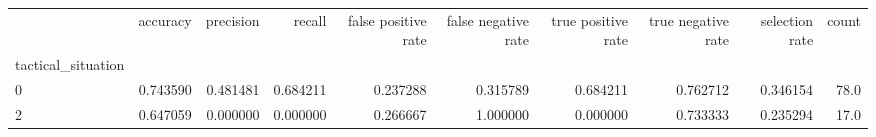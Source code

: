 \begin{tabular}{lrrrrrrrrr}
\toprule
{} &  accuracy &  precision &    recall &  false positive rate &  false negative rate &  true positive rate &  true negative rate &  selection rate &  count \\
tactical\_situation &           &            &           &                      &                      &                     &                     &                 &        \\
\midrule
0                  &  0.743590 &   0.481481 &  0.684211 &             0.237288 &             0.315789 &            0.684211 &            0.762712 &        0.346154 &   78.0 \\
2                  &  0.647059 &   0.000000 &  0.000000 &             0.266667 &             1.000000 &            0.000000 &            0.733333 &        0.235294 &   17.0 \\
\bottomrule
\end{tabular}
